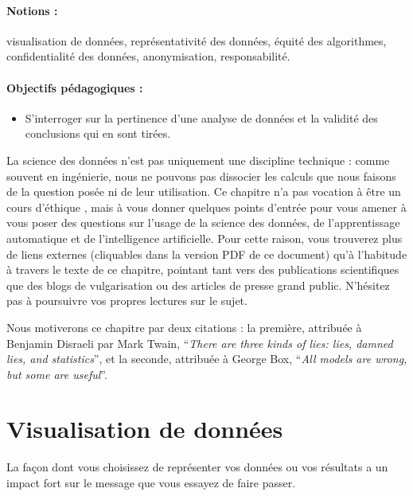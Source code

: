 \label{chap:pratiques}

\paragraph{Notions :} visualisation de données, représentativité des données,
équité des algorithmes, confidentialité des données, anonymisation,
responsabilité.

\paragraph{Objectifs pédagogiques :} 
\begin{itemize}      
  \setlength{\itemsep}{3pt}
\item S'interroger sur la pertinence d'une analyse de données et la validité
  des conclusions qui en sont tirées.
\end{itemize}

La science des données n'est pas uniquement une discipline technique : comme
souvent en ingénierie, nous ne pouvons pas dissocier les calculs que nous
faisons de la question posée ni de leur utilisation. Ce chapitre n'a pas
vocation à être un cours d'éthique%
, mais à vous donner
quelques points d'entrée pour vous amener à vous poser des questions sur
l'usage de la science des données, de l'apprentissage automatique et de
l'intelligence artificielle. Pour cette raison, vous trouverez plus de liens
externes (cliquables dans la version PDF de ce document) qu'à l'habitude à
travers le texte de ce chapitre, pointant tant vers des publications
scientifiques que des blogs de vulgarisation ou des articles de presse grand
public. N'hésitez pas à poursuivre vos propres lectures sur le sujet.

Nous motiverons ce chapitre par deux citations : la première, attribuée à
Benjamin Disraeli par Mark Twain, ``\textit{There are three kinds of lies:
  lies, damned lies, and statistics}'', et la seconde, attribuée à George
Box, ``\textit{All models are wrong, but some are useful}''.

\section{Visualisation de données}
La façon dont vous choisissez de représenter vos données ou vos résultats a un
impact fort sur le message que vous essayez de faire passer. 

